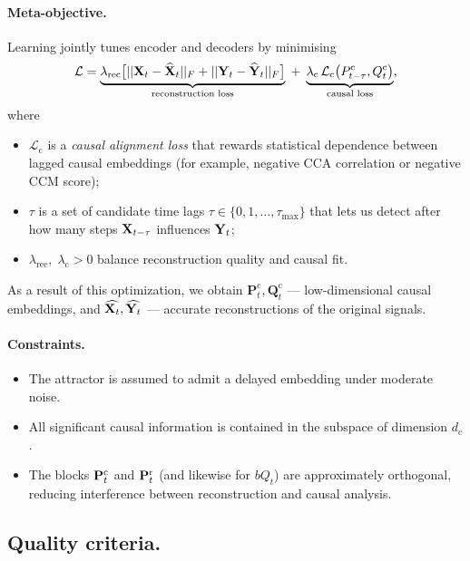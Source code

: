 \documentclass[14pt]{extarticle}
\begin{document}
	\paragraph{Meta-objective.}
	Learning jointly tunes encoder and decoders by minimising
	\[
	\mathcal L
	=
	\underbrace{\lambda_{\mathrm{rec}}
		\bigl[
		|| \mathbf{X}_t - \widehat {\mathbf{X}}_t ||_F + || \mathbf{Y}_t - \widehat {\mathbf{Y}}_t ||_F
		\bigr]}_{\text{reconstruction loss}}
	\;+\;
	\underbrace{\lambda_{\mathrm{c}}
		\,\mathcal L_{\mathrm c}\bigl(P_{t-\tau}^{\mathrm c},Q_t^{\mathrm c}\bigr)}_{\text{causal loss}},
	\]
	where  
	
	\begin{itemize}[leftmargin=1.4cm]
		\item $\mathcal L_{\mathrm c}$ is a \emph{causal alignment loss} that rewards statistical dependence between lagged causal embeddings  
		(for example, negative CCA correlation or negative CCM score);
		\item $\tau$ is a set of candidate time lags  
		$\tau \in \{0,1,\dots,\tau_{\max}\}$ that lets us detect after how many steps $\mathbf{X}_{t - \tau}$ influences $\mathbf{Y}_t$;
		\item $\lambda_{\mathrm{rec}}, \; \lambda_{\mathrm{c}}>0$ balance reconstruction quality and causal fit.
	\end{itemize}
	
	As a result of this optimization, we obtain
	$\mathbf P_t^{\mathrm c}, \mathbf Q_t^{\mathrm c}$ — low-dimensional causal embeddings, and 
	$\widehat{\mathbf{X}_t}, \widehat{\mathbf{Y}_t}$ — accurate reconstructions of the original signals.
	
	\paragraph{Constraints.}
	\begin{itemize}[nosep,leftmargin=1.2cm]
		\item The attractor is assumed to admit a delayed embedding under moderate noise.
		\item All significant causal information is contained in the subspace of dimension $d_{\mathrm c}$.
		\item The blocks $\mathbf{P}^{\mathrm c}_t$ and $\mathbf{P}^{\mathrm r}_t$ 
		(and likewise for $bQ_t$) are approximately orthogonal, reducing interference between reconstruction and causal analysis.
	\end{itemize}
	
	\subsection{Quality criteria.} \label{subsec:quality}
\end{document}
